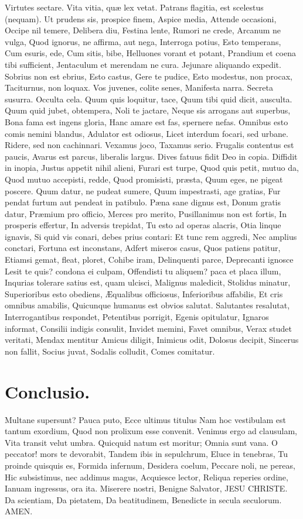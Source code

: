 \documentclass{book}
\begin{document}
Virtutes sectare.
Vita vitia, quæ lex vetat.
Patrans flagitia, est scelestus (nequam).
Ut prudens sis, prospice finem,
Aspice media,
Attende occasioni,
Occipe nil temere,
Delibera diu,
Festina lente,
Rumori ne crede,
Arcanum ne vulga,
Quod ignorus, ne affirma, aut nega,
Interroga potius,
Esto temperans,
Cum esuris, ede,
Cum sitis, bibe,
Helluones vorant et potant,
Prandium et coena tibi sufficient,
Jentaculum et merendam ne cura.
Jejunare aliquando expedit.
Sobrius non est ebrius,
Esto castus,
Gere te pudice,
Esto modestus, non procax,
Taciturnus, non loquax.
Vos juvenes, colite senes,
Manifesta narra.
Secreta susurra.
Occulta cela.
Quum quis loquitur, tace,
Quum tibi quid dicit, ausculta.
Quum quid jubet, obtempera,
Noli te jactare,
Neque sis arrogans aut superbus,
Bona fama est ingens gloria,
Hanc amare est fas,
spernere nefas.
Omnibus esto comis nemini blandus,
Adulator est odiosus,
Licet interdum focari, sed urbane.
Ridere, sed non cachinnari.
Vexamus joco,
Taxamus serio.
Frugalis contentus est paucis,
Avarus est parcus, liberalis largus.
Dives fatuus fidit Deo in copia.
Diffidit in inopia,
Justus appetit nihil alieni,
Furari est turpe,
Quod quis petit, mutuo da,
Quod mutuo accepisti, redde,
Quod promisisti, præsta,
Quum eges, ne pigeat poscere.
Quum datur, ne pudeat sumere,
Quum impestrasti, age gratias,
Fur pendat furtum aut pendeat in patibulo.
Pæna sane dignus est,
Donum gratis datur,
Præmium pro officio,
Merces pro merito,
Pusillanimus non est fortis,
In prosperis effertur,
In adversis trepidat,
Tu esto ad operas alacris,
Otia linque ignavis,
Si quid vis conari, debes prius contari:
Et tunc rem aggredi,
Nec amplius conctari,
Fortuna est inconstans,
Adfert miseros casus,
Quos patiens patitur,
Etiamsi gemat, fleat, ploret,
Cohibe iram,
Delinquenti parce,
Deprecanti ignosce
Lesit te quis? condona ei culpam,
Offendisti tu aliquem? paca et placa illum,
Inqurias tolerare satius est, quam ulcisci,
Malignus maledicit,
Stolidus minatur,
Superioribus esto obediens,
Æqualibus officiosus,
Inferioribus affabilis,
Et cris omnibus amabilis,
Quicunque humanus est obvios salutat.
Salutantes resalutat,
Interrogantibus respondet,
Petentibus porrigit,
Egenis opitulatur,
Ignaros informat,
Consilii indigis consulit,
Invidet memini,
Favet omnibus,
Verax studet veritati,
Mendax mentitur
Amicus diligit,
Inimicus odit,
Dolosus decipit,
Sincerus non fallit,
Socius juvat,
Sodalis colludit,
Comes comitatur.

\chapter{Conclusio.}

Multane supersunt?
Pauca puto,
Ecce ultimus titulus 
Nam hoc vestibulam est tantum exordium,
Quod non prolixum esse convenit.
Venimus ergo ad clausulam,
Vita transit velut umbra.
Quicquid natum est moritur;
Omnia sunt vana.
O peccator! mors te devorabit,
Tandem ibis in sepulchrum,
Eluce in tenebras,
Tu proinde quisquis es,
Formida infernum,
Desidera coelum,
Peccare noli, ne pereas,
Hic subsistimus, nec addimus magus,
Acquiesce lector,
Reliqua reperies ordine,
Ianuam ingressus, ora ita.
Miserere nostri,
Benigne Salvator,
JESU CHRISTE.
Da scientiam,
Da pietatem,
Da beatitudinem,
Benedicte in secula seculorum.
AMEN.
\end{document}
